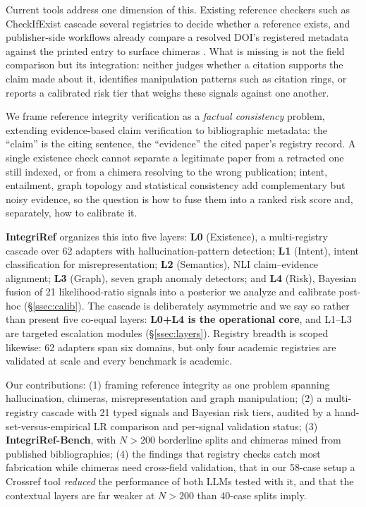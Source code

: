 \documentclass[letterpaper]{article} %
\begin{document}
Current tools address one dimension of this. Existing reference checkers such as CheckIfExist \cite{abbonato2026checkifexist} cascade several registries to decide whether a reference exists, and publisher-side workflows already compare a resolved DOI's registered metadata against the printed entry to surface chimeras \cite{dunford2024bibliography}. What is missing is not the field comparison but its integration: neither judges whether a citation supports the claim made about it, identifies manipulation patterns such as citation rings, or reports a calibrated risk tier that weighs these signals against one another.

We frame reference integrity verification as a \emph{factual consistency} problem, extending evidence-based claim verification \cite{thorne2018fever,wadden2020fact} to bibliographic metadata: the ``claim'' is the citing sentence, the ``evidence'' the cited paper's registry record. A single existence check cannot separate a legitimate paper from a retracted one still indexed, or from a chimera resolving to the wrong publication; intent, entailment, graph topology and statistical consistency add complementary but noisy evidence, so the question is how to fuse them into a ranked risk score and, separately, how to calibrate it.

\textbf{IntegriRef} organizes this into five layers: \textbf{L0} (Existence), a multi-registry cascade over 62 adapters with hallucination-pattern detection; \textbf{L1} (Intent), intent classification for misrepresentation; \textbf{L2} (Semantics), NLI claim--evidence alignment; \textbf{L3} (Graph), seven graph anomaly detectors; and \textbf{L4} (Risk), Bayesian fusion of 21 likelihood-ratio signals into a posterior we analyze and calibrate post-hoc (\S\ref{ssec:calib}). The cascade is deliberately asymmetric and we say so rather than present five co-equal layers: \textbf{L0+L4 is the operational core}, and L1--L3 are targeted escalation modules (\S\ref{ssec:layers}). Registry breadth is scoped likewise: 62 adapters span six domains, but only four academic registries are validated at scale and every benchmark is academic.

\noindent Our contributions: (1) framing reference integrity as one problem spanning hallucination, chimeras, misrepresentation and graph manipulation; (2) a multi-registry cascade with 21 typed signals and Bayesian risk tiers, audited by a hand-set-versus-empirical LR comparison and per-signal validation status; (3) \textbf{IntegriRef-Bench}, with $N{>}200$ borderline splits and chimeras mined from published bibliographies; (4) the findings that registry checks catch most fabrication while chimeras need cross-field validation, that in our 58-case setup a Crossref tool \emph{reduced} the performance of both LLMs tested with it, and that the contextual layers are far weaker at $N{>}200$ than 40-case splits imply.
\end{document}
